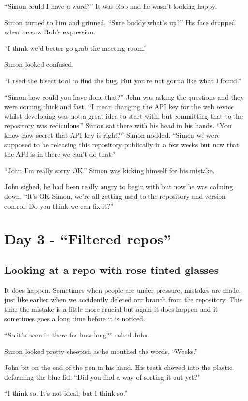 \begin{trenches}
``Simon could I have a word?'' It was Rob and he wasn't looking happy.

Simon turned to him and grinned, ``Sure buddy what's up?''  His face dropped when he saw Rob's expression.

``I think we'd better go grab the meeting room.''

Simon looked confused.

``I used the bisect tool to find the bug.  But you're not gonna like what I found.''

\thoughtbreak

``Simon how could you have done that?'' John was asking the questions and they were coming thick and fast.
``I mean changing the API key for the web sevice whilst developing was not a great idea to start with, but committing that to the repository was rediculous.''
Simon sat there with his head in his hands.
``You know how secret that API key is right?'' Simon nodded.
``Simon we were supposed to be releasing this repository publically in a few weeks but now that the API is in there we can't do that.''

``John I'm really sorry OK.'' Simon was kicking himself for his mistake.

John sighed, he had been really angry to begin with but now he was calming down,
``It's OK Simon, we're all getting used to the repository and version control.  Do you think we can fix it?''
\end{trenches}

\section{Day 3 - ``Filtered repos''}
\subsection{Looking at a repo with rose tinted glasses}

It does happen. Sometimes when people are under pressure, mistakes are made, just like earlier when we accidently deleted our branch from the repository.
This time the mistake is a little more crucial but again it does happen and it sometimes goes a long time before it is noticed.

\begin{trenches}
``So it's been in there for how long?'' asked John.

Simon looked pretty sheepish as he mouthed the words, ``Weeks.''

John bit on the end of the pen in his hand.
His teeth chewed into the plastic, deforming the blue lid.
``Did you find a way of sorting it out yet?''

``I think so. It's not ideal, but I think so.''
\end{trenches}

